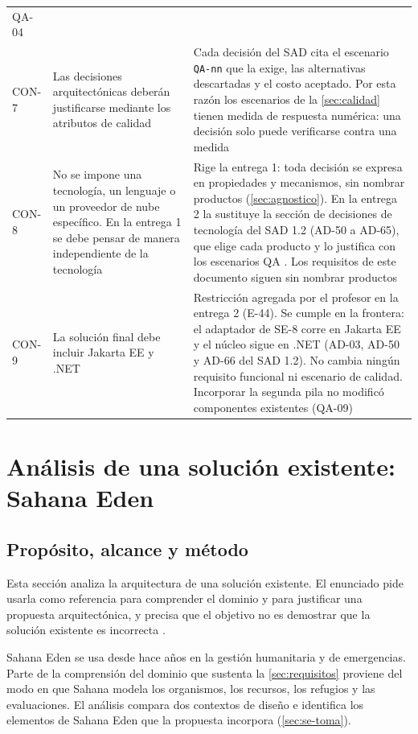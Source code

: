 \documentclass[11pt,letterpaper]{article}
\begin{document}
\begin{longtable}{L{1.4cm} L{5.6cm} L{8.6cm}}
QA-04 \\
CON-7 & Las decisiones arquitectónicas deberán justificarse mediante los atributos de calidad &
Cada decisión del SAD cita el escenario \texttt{QA-nn} que la exige, las alternativas descartadas y
el costo aceptado. Por esta razón los escenarios de la \cref{sec:calidad} tienen medida de respuesta
numérica: una decisión solo puede verificarse contra una medida \\
CON-8 & No se impone una tecnología, un lenguaje o un proveedor de nube específico. En la entrega 1
se debe pensar de manera independiente de la tecnología & Rige la entrega 1: toda decisión se
expresa en propiedades y mecanismos, sin nombrar productos (\cref{sec:agnostico}). En la entrega 2
la sustituye la sección de decisiones de tecnología del SAD 1.2 (AD-50 a AD-65), que elige cada
producto y lo justifica con los escenarios QA \cite{sad,enunciado}. Los requisitos de este documento
siguen sin nombrar productos \\
CON-9 & La solución final debe incluir Jakarta EE y .NET & Restricción agregada por el profesor en
la entrega 2 (E-44). Se cumple en la frontera: el adaptador de SE-8 corre en Jakarta EE y el núcleo
sigue en .NET (AD-03, AD-50 y AD-66 del SAD 1.2). No cambia ningún requisito funcional ni
escenario de calidad. Incorporar la segunda pila no modificó componentes existentes (QA-09) \\
\end{longtable}

\newpage
\section{Análisis de una solución existente: Sahana Eden}
\label{sec:sahana}

\subsection{Propósito, alcance y método}
\label{sec:sahana-metodo}

Esta sección analiza la arquitectura de una solución existente. El enunciado pide usarla como
referencia para comprender el dominio y para justificar una propuesta arquitectónica, y precisa que
el objetivo no es demostrar que la solución existente es incorrecta \cite{enunciado}.

Sahana Eden se usa desde hace años en la gestión humanitaria y de emergencias. Parte de la
comprensión del dominio que sustenta la \cref{sec:requisitos} proviene del modo en que Sahana modela
los organismos, los recursos, los refugios y las evaluaciones. El análisis compara dos contextos de
diseño e identifica los elementos de Sahana Eden que la propuesta incorpora
(\cref{sec:se-toma}).
\end{document}
